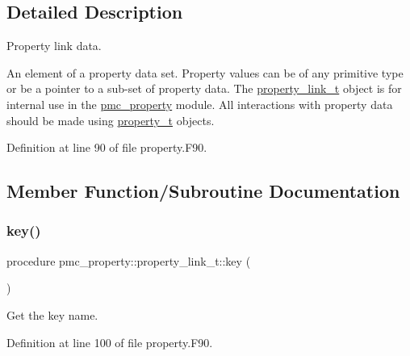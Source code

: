 \subsection{Detailed Description}
Property link data. 

An element of a property data set. Property values can be of any primitive type or be a pointer to a sub-\/set of property data. The \mbox{\hyperlink{structpmc__property_1_1property__link__t}{property\+\_\+link\+\_\+t}} object is for internal use in the \mbox{\hyperlink{namespacepmc__property}{pmc\+\_\+property}} module. All interactions with property data should be made using \mbox{\hyperlink{structpmc__property_1_1property__t}{property\+\_\+t}} objects. 

Definition at line 90 of file property.\+F90.



\subsection{Member Function/\+Subroutine Documentation}
\mbox{\label{structpmc__property_1_1property__link__t_a0c80b3d389d2619ddba7c05a924f7200}} 
\subsubsection{\texorpdfstring{key()}{key()}}
{\footnotesize\ttfamily procedure pmc\+\_\+property\+::property\+\_\+link\+\_\+t\+::key (\begin{DoxyParamCaption}{ }\end{DoxyParamCaption})\hspace{0.3cm}{\ttfamily [private]}}



Get the key name. 



Definition at line 100 of file property.\+F90.

\mbox{\label{structpmc__property_1_1property__link__t_a7bb9bb28acf068411faf76abddac6823}} 

